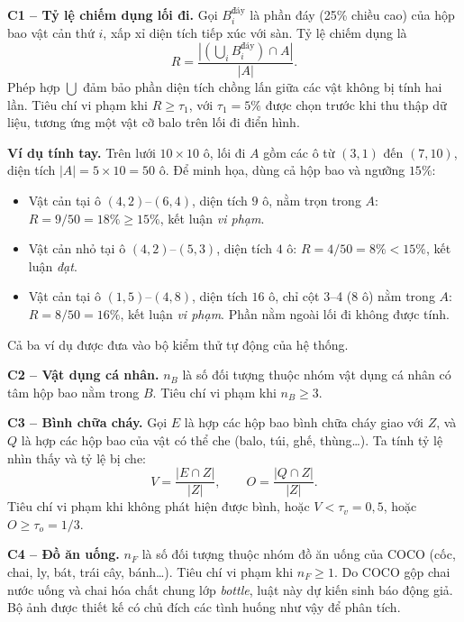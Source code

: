 \documentclass[conference]{IEEEtran}
\begin{document}
\textbf{C1 -- Tỷ lệ chiếm dụng lối đi.} Gọi $B_i^{\text{đáy}}$ là phần đáy (25\% chiều cao) của hộp bao vật cản thứ $i$, xấp xỉ diện tích tiếp xúc với sàn. Tỷ lệ chiếm dụng là
\begin{equation}
  R = \frac{\left|\left(\bigcup_i B_i^{\text{đáy}}\right) \cap A\right|}{|A|}.
  \label{eq:R}
\end{equation}
Phép hợp $\bigcup$ đảm bảo phần diện tích chồng lấn giữa các vật không bị tính hai lần. Tiêu chí vi phạm khi $R \ge \tau_1$, với $\tau_1 = 5\%$ được chọn trước khi thu thập dữ liệu, tương ứng một vật cỡ balo trên lối đi điển hình.

\textbf{Ví dụ tính tay.} Trên lưới $10\times10$ ô, lối đi $A$ gồm các ô từ $(3,1)$ đến $(7,10)$, diện tích $|A| = 5\times10 = 50$ ô. Để minh họa, dùng cả hộp bao và ngưỡng $15\%$:
\begin{itemize}
  \item Vật cản tại ô $(4,2)$--$(6,4)$, diện tích $9$ ô, nằm trọn trong $A$: $R = 9/50 = 18\% \ge 15\%$, kết luận \emph{vi phạm}.
  \item Vật cản nhỏ tại ô $(4,2)$--$(5,3)$, diện tích $4$ ô: $R = 4/50 = 8\% < 15\%$, kết luận \emph{đạt}.
  \item Vật cản tại ô $(1,5)$--$(4,8)$, diện tích $16$ ô, chỉ cột 3--4 (8 ô) nằm trong $A$: $R = 8/50 = 16\%$, kết luận \emph{vi phạm}. Phần nằm ngoài lối đi không được tính.
\end{itemize}
Cả ba ví dụ được đưa vào bộ kiểm thử tự động của hệ thống.

\textbf{C2 -- Vật dụng cá nhân.} $n_B$ là số đối tượng thuộc nhóm vật dụng cá nhân có tâm hộp bao nằm trong $B$. Tiêu chí vi phạm khi $n_B \ge 3$.

\textbf{C3 -- Bình chữa cháy.} Gọi $E$ là hợp các hộp bao bình chữa cháy giao với $Z$, và $Q$ là hợp các hộp bao của vật có thể che (balo, túi, ghế, thùng\ldots). Ta tính tỷ lệ nhìn thấy và tỷ lệ bị che:
\begin{equation}
  V = \frac{|E \cap Z|}{|Z|}, \qquad O = \frac{|Q \cap Z|}{|Z|}.
  \label{eq:VO}
\end{equation}
Tiêu chí vi phạm khi không phát hiện được bình, hoặc $V < \tau_v = 0{,}5$, hoặc $O \ge \tau_o = 1/3$.

\textbf{C4 -- Đồ ăn uống.} $n_F$ là số đối tượng thuộc nhóm đồ ăn uống của COCO (cốc, chai, ly, bát, trái cây, bánh\ldots). Tiêu chí vi phạm khi $n_F \ge 1$. Do COCO gộp chai nước uống và chai hóa chất chung lớp \emph{bottle}, luật này dự kiến sinh báo động giả. Bộ ảnh được thiết kế có chủ đích các tình huống như vậy để phân tích.
\end{document}
